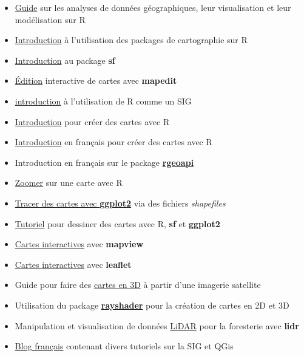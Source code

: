 \documentclass[
]{book}
\providecommand{\tightlist}{%
  \setlength{\itemsep}{0pt}\setlength{\parskip}{0pt}}
\begin{document}
\begin{itemize}
\tightlist
\item
  \href{https://geocompr.robinlovelace.net/}{Guide} sur les analyses de données
  géographiques, leur visualisation et leur modélisation sur R
\item
  \href{https://statnmap.com/2018-07-14-introduction-to-mapping-with-sf-and-co/}{Introduction}
  à l'utilisation des packages de cartographie sur R
\item
  \href{https://www.infoworld.com/article/3505897/how-to-do-spatial-analysis-in-r-with-sf.amp.html}{Introduction}
  au package \textbf{sf}
\item
  \href{https://github.com/r-spatial/mapedit}{Édition} interactive de cartes avec
  \textbf{mapedit}
\item
  \href{https://mhallwor.github.io/_pages/welcome}{introduction} à l'utilisation de R
  comme un SIG
\item
  \href{http://eriqande.github.io/rep-res-web/lectures/making-maps-with-R.html}{Introduction}
  pour créer des cartes avec R
\item
  \href{https://thinkr.fr/sil-te-plait-dessine-moi-carte-r/}{Introduction}
  en français pour créer des cartes avec R
\item
  Introduction en français sur le package
  \href{https://colinfay.me/carte-r-rgeoapi-ggplot2/}{\textbf{rgeoapi}}
\item
  \href{https://rgeomatic.hypotheses.org/tag/sf}{Zoomer} sur une carte avec R
\item
  \href{https://rpubs.com/huanfaChen/ggplotShapefile}{Tracer des cartes avec \textbf{ggplot2}}
  via des fichiers \emph{shapefiles}
\item
  \href{https://www.r-spatial.org/r/2018/10/25/ggplot2-sf.html}{Tutoriel}
  pour dessiner des cartes avec R, \textbf{sf} et \textbf{ggplot2}
\item
  \href{https://r-spatial.github.io/mapview/}{Cartes interactives} avec \textbf{mapview}
\item
  \href{https://rstudio.github.io/leaflet/}{Cartes interactives} avec \textbf{leaflet}
\item
  Guide pour faire des
  \href{https://www.tylermw.com/a-step-by-step-guide-to-making-3d-maps-with-satellite-imagery-in-r/}{cartes en 3D}
  à partir d'une imagerie satellite
\item
  Utilisation du package \href{https://www.rayshader.com/}{\textbf{rayshader}} pour la
  création de cartes en 2D et 3D
\item
  Manipulation et visualisation de données
  \href{https://github.com/Jean-Romain/lidR}{LiDAR} pour la foresterie avec \textbf{lidr}
\item
  \href{https://www.sigterritoires.fr/index.php/concepts/}{Blog français} contenant
  divers tutoriels sur la SIG et QGis
\end{itemize}

  
\end{document}
